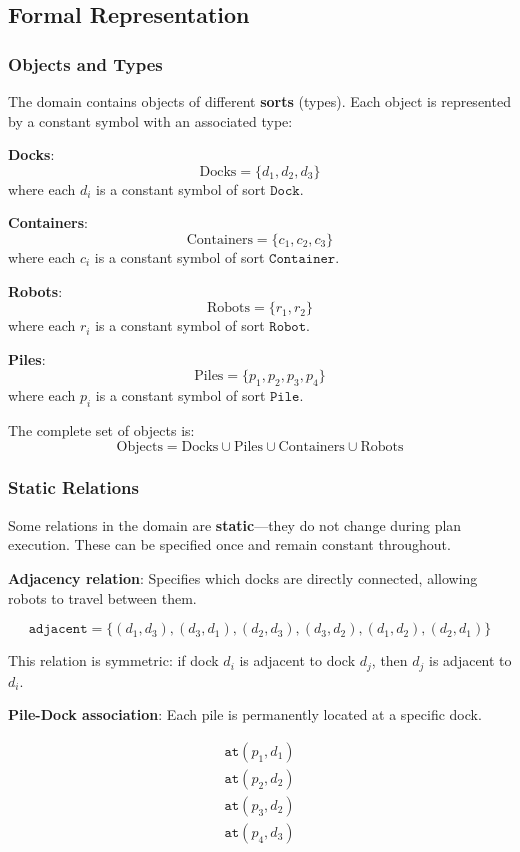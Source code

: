 \documentclass[11pt,a4paper]{article}
\theoremstyle{definition}
\theoremstyle{plain}
\theoremstyle{remark}
\begin{document}
\subsection{Formal Representation}

\subsubsection{Objects and Types}

The domain contains objects of different \textbf{sorts} (types). Each object is represented by a constant symbol with an associated type:

\textbf{Docks}: 
\[
\text{Docks} = \{d_1, d_2, d_3\}
\]
where each $d_i$ is a constant symbol of sort $\texttt{Dock}$.

\textbf{Containers}:
\[
\text{Containers} = \{c_1, c_2, c_3\}
\]
where each $c_i$ is a constant symbol of sort $\texttt{Container}$.

\textbf{Robots}:
\[
\text{Robots} = \{r_1, r_2\}
\]
where each $r_i$ is a constant symbol of sort $\texttt{Robot}$.

\textbf{Piles}:
\[
\text{Piles} = \{p_1, p_2, p_3, p_4\}
\]
where each $p_i$ is a constant symbol of sort $\texttt{Pile}$.

The complete set of objects is:
\[
\text{Objects} = \text{Docks} \cup \text{Piles} \cup \text{Containers} \cup \text{Robots}
\]

\subsubsection{Static Relations}

Some relations in the domain are \textbf{static}—they do not change during plan execution. These can be specified once and remain constant throughout.

\textbf{Adjacency relation}: Specifies which docks are directly connected, allowing robots to travel between them.

\[
\texttt{adjacent} = \{(d_1, d_3), (d_3, d_1), (d_2, d_3), (d_3, d_2), (d_1, d_2), (d_2, d_1)\}
\]

This relation is symmetric: if dock $d_i$ is adjacent to dock $d_j$, then $d_j$ is adjacent to $d_i$.

\textbf{Pile-Dock association}: Each pile is permanently located at a specific dock.

\[
\begin{array}{l}
\texttt{at}(p_1, d_1) \\
\texttt{at}(p_2, d_2) \\
\texttt{at}(p_3, d_2) \\
\texttt{at}(p_4, d_3)
\end{array}
\]
\end{document}
